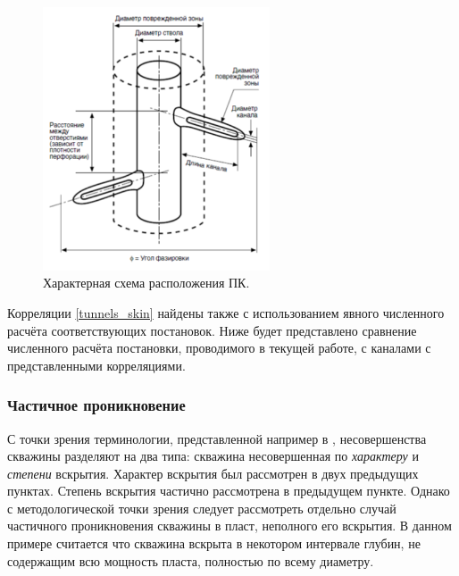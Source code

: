 \begin{figure}[H]
	\label{pic:tunnels}
	\centerline{\includegraphics[width=0.6\textwidth]{pic/tunnels.png}}
	\caption{Характерная схема расположения ПК.}
\end{figure}

	Корреляции \eqref{tunnels_skin} найдены также с использованием явного численного расчёта соответствующих постановок. Ниже будет представлено сравнение численного расчёта постановки, проводимого в текущей работе, с каналами с представленными корреляциями.

\subsubsection{Частичное проникновение}
	
	С точки зрения терминологии, представленной например в \cite{basniev}, несовершенства скважины разделяют на два типа: скважина несовершенная по \textit{характеру} и \textit{степени} вскрытия. Характер вскрытия был рассмотрен в двух предыдущих пунктах. Степень вскрытия частично рассмотрена в предыдущем пункте. Однако с методологической точки зрения следует рассмотреть отдельно случай частичного проникновения скважины в пласт, неполного его вскрытия.
В данном примере считается что скважина вскрыта в некотором интервале глубин, не содержащим всю мощность пласта, полностью по всему диаметру.

